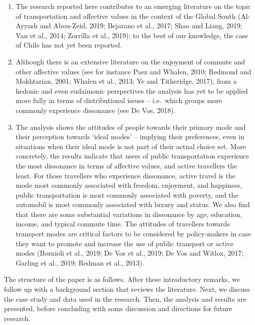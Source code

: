 \documentclass[]{elsarticle} %
\begin{document}
\begin{enumerate}
\def\labelenumi{\arabic{enumi}.}
\item
  The research reported here contributes to an emerging literature on
  the topic of transportation and affective values in the context of the
  Global South (Al-Ayyash and Abou-Zeid, 2019; Bejarano et al., 2017;
  Shao and Liang, 2019; Van et al., 2014; Zorrilla et al., 2019); to the
  best of our knowledge, the case of Chile has not yet been reported.
\item
  Although there is an extensive literature on the enjoyment of commute
  and other affective values (see for instance Paez and Whalen, 2010;
  Redmond and Mokhtarian, 2001; Whalen et al., 2013; Ye and Titheridge,
  2017), from a hedonic and even eudaimonic perspectives the analysis
  has yet to be applied more fully in terms of distributional issues --
  i.e.~which groups more commonly experience dissonance (see De Vos,
  2018).
\item
  The analysis shows the attitudes of people towards their primary mode
  and their perception towards `ideal modes' -- implying their
  preferences, even in situations when their ideal mode is not part of
  their actual choice set. More concretely, the results indicate that
  users of public transportation experience the most dissonance in terms
  of affective values, and active travellers the least. For those
  travellers who experience dissonance, active travel is the mode most
  commonly associated with freedom, enjoyment, and happiness, public
  transportation is most commonly associated with poverty, and the
  automobil is most commonly associated with luxury and status. We also
  find that there are some substantial variations in dissonance by age,
  education, income, and typical commute time. The attitudes of
  travellers towards transport modes are critical factors to be
  considered by policy-makers in case they want to promote and increase
  the use of public transport or active modes (Bornioli et al., 2019; De
  Vos et al., 2019; De Vos and Witlox, 2017; Garling et al., 2019;
  Redman et al., 2013).
\end{enumerate}

The structure of the paper is as follows. After these introductory
remarks, we follow up with a background section that reviews the
literature. Next, we discuss the case study and data used in the
research. Then, the analysis and results are presented, before
concluding with some discussion and directions for future research.
\end{document}
